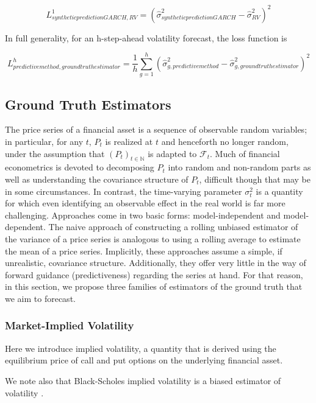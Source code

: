 \documentclass[11pt]{article}
\def\mc#1{\mathcal{#1}} %
\def\mc#1{\mathcal{#1}}
\theoremstyle{definition}
\begin{document}
$$ L^{1}_{synthetic prediction GARCH, RV} = (\hat\sigma^{2}_{synthetic prediction GARCH} - \hat\sigma^{2}_{RV})^{2}$$

In full generality, for an h-step-ahead volatility forecast, the loss function is 

$$ L^{h}_{predictive method, ground truth estimator} = \frac{1}{h}\sum_{g=1}^{h}(\hat\sigma^{2}_{g, predictive method} - \hat\sigma^{2}_{g, ground truth estimator})^{2}$$



\subsection{Ground Truth Estimators}
\label{Ground Truth Estimators}

The price series of a financial asset is a sequence of observable random variables; in particular, for any $t$, $P_{t}$ is realized at $t$ and henceforth no longer random, under the assumption that $(P_{t})_{t\in\mathbb{N}}$ is adapted to $\mc{F}_{t}$.  Much of financial econometrics is devoted to decomposing $P_{t}$ into random and non-random parts as well as understanding the covariance structure of $P_{t}$, difficult though that may be in some circumstances.  In contrast, the time-varying parameter $\sigma^{2}_{t}$ is a quantity for which even identifying an observable effect in the real world is far more challenging.  Approaches come in two basic forms: model-independent and model-dependent.  The naive approach of constructing a rolling unbiased estimator of the variance of a price series is analogous to using a rolling average to estimate the mean of a price series.  Implicitly, these approaches assume a simple, if unrealistic, covariance structure.  Additionally, they offer very little in the way of forward guidance (predictiveness) regarding the series at hand.  For that reason, in this section, we propose three families of estimators of the ground truth that we aim to forecast.

\subsubsection{Market-Implied Volatility}

Here we introduce implied volatility, a quantity that is derived using the equilibrium price of call and put options on the underlying financial asset.

We note also that Black-Scholes implied volatility is a biased estimator of volatility \citep{christensen1998relation}.
\end{document}
